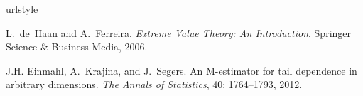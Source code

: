 %
%    
 

\begin{thebibliography}{29}
\providecommand{\natexlab}[1]{#1}
\providecommand{\url}[1]{\texttt{#1}}
\expandafter\ifx\csname urlstyle\endcsname\relax
  \providecommand{\doi}[1]{doi: #1}\else
  \providecommand{\doi}{doi: \begingroup \urlstyle{rm}\Url}\fi
  
L.~de~Haan and A.~Ferreira.
\newblock \emph{Extreme Value Theory: An Introduction}.
\newblock Springer Science \& Business Media, 2006.

J.H. Einmahl, A.~Krajina, and J.~Segers.
\newblock An {M}-estimator for tail dependence in arbitrary dimensions.
\newblock \emph{The Annals of Statistics}, 40: 1764--1793, 2012.
\end{thebibliography}